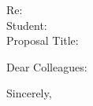 \documentclass{letter}
\begin{document}
\address{Room}


\begin{letter}
{Re: \\
Student: \\
Proposal Title: }
\date{\today}
\opening{Dear Colleagues:}


\closing{Sincerely,}

\end{letter}
\end{document}
